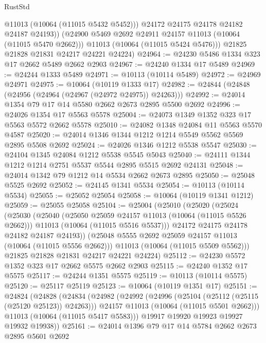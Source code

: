 \begin{lexlean}{RustStd}
\begin{coremodule}
              @11013
              (@10064 (@11015 @5432 @5452)))
            @24172
            @24175
            @24178
            @24182
            @24187
            @24193))
        (@24900 @5469 @2692 @24911 @24157 @11013 (@10064 (@11015 @5470 @2662)))
        @11013
        (@10064 (@11015 @5424 @5476)))
      @21825
      @21828
      @21831
      @24217
      @24221
      @24224)
@24964 := @24230 @5486 @1334 @323 @17 @2662 @5489 @2662 @2903
@24967 := @24240 @1334 @17 @5489
@24969 := @24244 @1333 @5489
@24971 := @10113 (@10114 @5489)
@24972 := @24969 @24971
@24975 := @10064 (@10119 @1333 @17)
@24982 := @24844 (@24848 (@24956 (@24964 (@24967 (@24972 @24975)) @24263)))
@24992 := @24014 @1354 @79 @17 @14 @5580 @2662 @2673 @2895 @5500 @2692
@24996 := @24026 @1354 @17 @5563 @5578
@25004 := @24073 @1349 @1352 @323 @17 @5563 @5572 @2662 @5578
@25010 := @24082 @1348 @24084 @11 @5563 @5570 @4587
@25020 := @24014 @1346 @1344 @1212 @1214 @5549 @5562 @5569 @2895 @5508 @2692
@25024 := @24026 @1346 @1212 @5538 @5547
@25030 := @24104 @1345 @24084 @1212 @5538 @5545 @5043
@25040 := @24111 @1344 @1212 @1214 @2751 @5537 @5544 @2895 @5515 @2692 @24131
@25048 := @24014 @1342 @79 @1212 @14 @5534 @2662 @2673 @2895
@25050 := @25048 @5525 @2692
@25052 := @24145 @1341 @5534
@25054 := @10113 (@10114 @5534)
@25055 := @25052 @25054
@25058 := @10064 (@10119 @1341 @1212)
@25059 := @25055 @25058
@25104 := @25004
    (@25010
      (@25020
        (@25024
          (@25030
            (@25040
              (@25050 @25059 @24157 @11013 (@10064 (@11015 @5526 @2662)))
              @11013
              (@10064 (@11015 @5516 @5537)))
            @24172
            @24175
            @24178
            @24182
            @24187
            @24193))
        (@25048 @5555 @2692 @25059 @24157 @11013 (@10064 (@11015 @5556 @2662)))
        @11013
        (@10064 (@11015 @5509 @5562)))
      @21825
      @21828
      @21831
      @24217
      @24221
      @24224)
@25112 := @24230 @5572 @1352 @323 @17 @2662 @5575 @2662 @2903
@25115 := @24240 @1352 @17 @5575
@25117 := @24244 @1351 @5575
@25119 := @10113 (@10114 @5575)
@25120 := @25117 @25119
@25123 := @10064 (@10119 @1351 @17)
@25151 := @24824
    (@24828
      (@24834
        (@24982
          (@24992
            (@24996 (@25104 (@25112 (@25115 (@25120 @25123)) @24263)))
            @24157
            @11013
            (@10064 (@11015 @5501 @2662)))
          @11013
          (@10064 (@11015 @5417 @5583)))
        @19917
        @19920
        @19923
        @19927
        @19932
        @19938))
@25161 := @24014 @1396 @79 @17 @14 @5784 @2662 @2673 @2895 @5601 @2692

\end{coremodule}
\end{lexlean}
